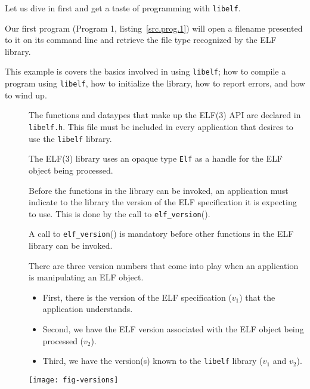 \documentclass[a4paper]{book}
\makeatletter
\newcommand{\function}[1]{\texttt{#1}()}
\newcommand{\filename}[1]{\texttt{#1}}
\newcommand{\library}[1]{\texttt{#1}}
\newcommand{\type}[1]{\texttt{#1}}
\newenvironment{callout}[2][blue]{%
  \begingroup\newcommand{\@cocolor}{#1}%
  \newcommand{\@cogroup}[1]{#2}}{\endgroup}
\newcommand{\@co}[1]{\framebox{\textbf{\color{\@cocolor}#1}}}
\newcommand{\coref}[1]{%
  \hypertarget{\@cogroup.#1.cr}{%
    \hyperlink{\@cogroup.#1.co}{\@co{#1}}}}
\makeatother
\begin{document}
Let us dive in first and get a taste of programming with
\library{libelf}.

Our first program (Program 1, listing~\vref{src.prog.1}) will open a
filename presented to it on its command line and retrieve the file
type recognized by the ELF library.

This example is covers the basics involved in using \library{libelf};
how to compile a program using \library{libelf}, how to initialize the
library, how to report errors, and how to wind up.

\begin{callout}{prog1}
  

  \begin{description}
  \item[\coref{1}] The functions and dataypes that make up the ELF(3) API
    are declared in \filename{libelf.h}.  This file must be included
    in every application that desires to use the \library{libelf}
    library.

  \item[\coref{2}] The ELF(3) library uses an opaque type \type{Elf} as a
    handle for the ELF object being processed.

  \item[\coref{4}] Before the functions in the library can be invoked, an
    application must indicate to the library the version of the ELF
    specification it is expecting to use.  This is done by the call to
    \function{elf\_version}.

    A call to \function{elf\_version} is mandatory before other
    functions in the ELF library can be invoked.

    There are three version numbers that come into play when an
    application is manipulating an ELF object.

    \begin{itemize}
    \item First, there is the version of the ELF specification ($v_1$)
      that the application understands.
    \item Second, we have the ELF version associated with the ELF
      object being processed ($v_2$).
    \item Third, we have the version(s) known to the \library{libelf}
      library ($v_1$ and $v_2$).
    \end{itemize}

    \label{fig.versions} \texttt{[image: fig-versions]}


\end{description}
\end{callout}
\end{document}
